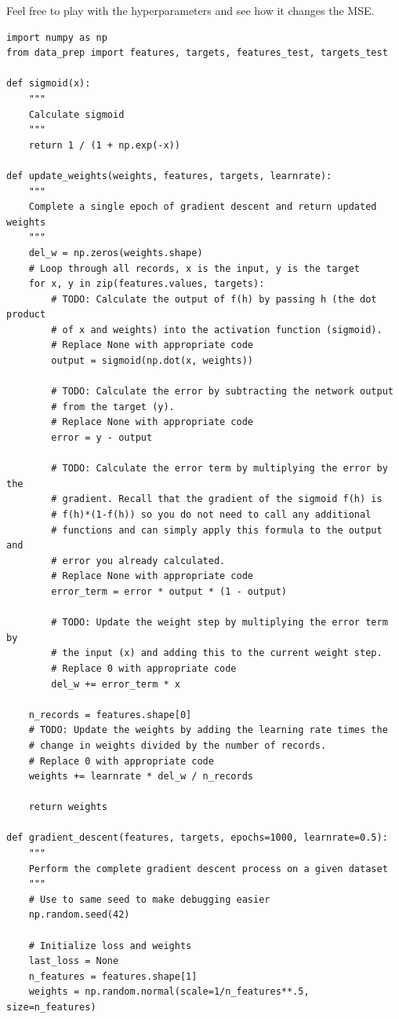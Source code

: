 Feel free to play with the hyperparameters and see how it changes the MSE.

\begin{lstlisting}
import numpy as np
from data_prep import features, targets, features_test, targets_test

def sigmoid(x):
    """
    Calculate sigmoid
    """
    return 1 / (1 + np.exp(-x))

def update_weights(weights, features, targets, learnrate):
    """
    Complete a single epoch of gradient descent and return updated weights
    """
    del_w = np.zeros(weights.shape)
    # Loop through all records, x is the input, y is the target
    for x, y in zip(features.values, targets):
        # TODO: Calculate the output of f(h) by passing h (the dot product
        # of x and weights) into the activation function (sigmoid).
        # Replace None with appropriate code
        output = sigmoid(np.dot(x, weights))

        # TODO: Calculate the error by subtracting the network output
        # from the target (y).
        # Replace None with appropriate code
        error = y - output

        # TODO: Calculate the error term by multiplying the error by the
        # gradient. Recall that the gradient of the sigmoid f(h) is
        # f(h)*(1-f(h)) so you do not need to call any additional
        # functions and can simply apply this formula to the output and
        # error you already calculated.
        # Replace None with appropriate code
        error_term = error * output * (1 - output)

        # TODO: Update the weight step by multiplying the error term by
        # the input (x) and adding this to the current weight step.
        # Replace 0 with appropriate code
        del_w += error_term * x

    n_records = features.shape[0]
    # TODO: Update the weights by adding the learning rate times the
    # change in weights divided by the number of records.
    # Replace 0 with appropriate code
    weights += learnrate * del_w / n_records
    
    return weights

def gradient_descent(features, targets, epochs=1000, learnrate=0.5):
    """
    Perform the complete gradient descent process on a given dataset
    """
    # Use to same seed to make debugging easier
    np.random.seed(42)
    
    # Initialize loss and weights
    last_loss = None
    n_features = features.shape[1]
    weights = np.random.normal(scale=1/n_features**.5, size=n_features)


\end{lstlisting}
